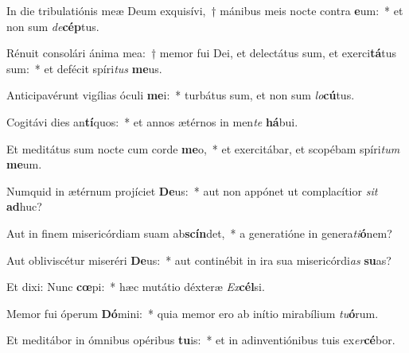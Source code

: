 \item In die tribulatiónis meæ Deum exquisívi,~† mánibus meis nocte contra \textbf{e}um:~* et non sum \textit{de}\textbf{cép}tus.
\item Rénuit consolári ánima mea:~† memor fui Dei, et delectátus sum, et exerci\textbf{tá}tus sum:~* et defécit spíri\textit{tus} \textbf{me}us.
\item Anticipavérunt vigílias óculi \textbf{me}i:~* turbátus sum, et non sum \textit{lo}\textbf{cú}tus.
\item Cogitávi dies an\textbf{tí}quos:~* et annos ætérnos in men\textit{te} \textbf{há}bui.
\item Et meditátus sum nocte cum corde \textbf{me}o,~* et exercitábar, et scopébam spíri\textit{tum} \textbf{me}um.
\item Numquid in ætérnum projíciet \textbf{De}us:~* aut non appónet ut complacítior \textit{sit} \textbf{ad}huc?
\item Aut in finem misericórdiam suam ab\textbf{scín}det,~* a generatióne in genera\textit{ti}\textbf{ó}nem?
\item Aut obliviscétur miseréri \textbf{De}us:~* aut continébit in ira sua misericórdi\textit{as} \textbf{su}as?
\item Et dixi: Nunc \textbf{cœ}pi:~* hæc mutátio déxteræ \textit{Ex}\textbf{cél}si.
\item Memor fui óperum \textbf{Dó}mini:~* quia memor ero ab inítio mirabílium \textit{tu}\textbf{ó}rum.
\item Et meditábor in ómnibus opéribus \textbf{tu}is:~* et in adinventiónibus tuis ex\textit{er}\textbf{cé}bor.

